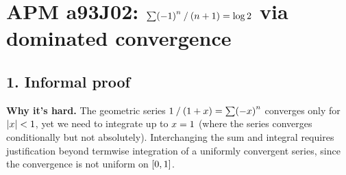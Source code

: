\documentclass[
]{article}
\author{}
\date{}
\begin{document}
\hypertarget{apm-a93j02-ux3c3--1ux207fn1-log-2-via-dominated-convergence}{%
\section{\texorpdfstring{APM a93J02:
\(\sum \mathopen{\mDelimiter{(}}-{\mNumber{1}}\mathclose{\mDelimiter{)}}^{n}\mathbin{\mBridgeOperator{/}}\mathopen{\mDelimiter{(}}n+{\mNumber{1}}\mathclose{\mDelimiter{)}} = \log {\mNumber{2}}\)
via dominated
convergence}{APM a93J02: \textbackslash sum \textbackslash mathopen\{\textbackslash mDelimiter\{(\}\}-\{\textbackslash mNumber\{1\}\}\textbackslash mathclose\{\textbackslash mDelimiter\{)\}\}\^{}\{n\}\textbackslash mathbin\{\textbackslash mBridgeOperator\{/\}\}\textbackslash mathopen\{\textbackslash mDelimiter\{(\}\}n+\{\textbackslash mNumber\{1\}\}\textbackslash mathclose\{\textbackslash mDelimiter\{)\}\} = \textbackslash log \{\textbackslash mNumber\{2\}\} via dominated convergence}}\label{apm-a93j02-ux3c3--1ux207fn1-log-2-via-dominated-convergence}}

\hypertarget{informal-proof}{%
\subsection{1. Informal proof}\label{informal-proof}}

\textbf{Why it's hard.} The geometric series
\({\mNumber{1}}\mathbin{\mBridgeOperator{/}}\mathopen{\mDelimiter{(}}{\mNumber{1}}+x\mathclose{\mDelimiter{)}} = \sum \mathopen{\mDelimiter{(}}-x\mathclose{\mDelimiter{)}}^{n}\)
converges only for \(|x| < {1}\), yet we need to integrate up
to \(x = {1}\) (where the series converges conditionally but
not absolutely). Interchanging the sum and integral requires
justification beyond termwise integration of a uniformly convergent
series, since the convergence is not uniform on
\(\mathopen{[}{0},{1}\mathclose{]}\).
\end{document}
